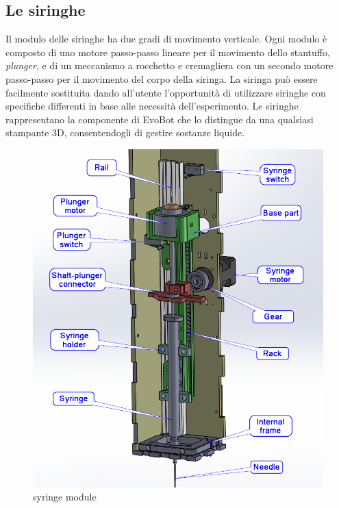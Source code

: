 \subsection{Le siringhe}
\label{sec:01456}
Il modulo delle siringhe ha due gradi di movimento verticale. Ogni modulo è composto di uno motore passo-passo lineare per il movimento dello stantuffo, \emph{plunger}, e di un meccanismo a rocchetto e cremagliera con un secondo motore passo-passo per il movimento del corpo della siringa. La siringa può essere facilmente sostituita dando all'utente l'opportunità di utilizzare siringhe con specifiche differenti in base alle necessità dell'esperimento. Le siringhe rappresentano la componente di EvoBot che lo distingue da una qualsiasi stampante 3D, consentendogli di gestire sostanze liquide.
	\begin{figure}[h]
	  \includegraphics[scale=0.30]{immagini/syringe_parts.png}
		\centering
	 \caption{syringe module}
	\end{figure} 

\pagebreak 

